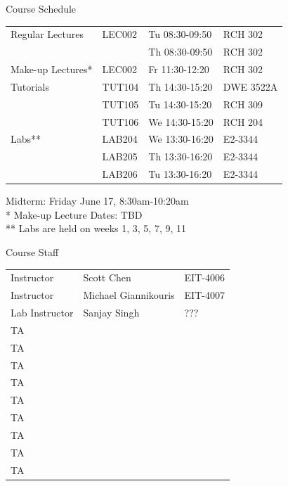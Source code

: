 \documentclass{beamer}
\begin{document}
	\begin{frame}{Course Schedule}
		\begin{center}
			\begin{tabular}{l l l l}
				Regular Lectures & LEC002 & Tu 08:30-09:50 & RCH 302 	\\
								 & 		  & Th 08:30-09:50 & RCH 302 	\\
				\hline
				Make-up Lectures*& LEC002 & Fr 11:30-12:20 & RCH 302 	\\
				\hline			
				Tutorials 		 & TUT104 & Th 14:30-15:20 & DWE 3522A 	\\
						  		 & TUT105 & Tu 14:30-15:20 & RCH 309   	\\
						  		 & TUT106 & We 14:30-15:20 & RCH 204   	\\
				\hline			
				Labs** 	  		 & LAB204 & We 13:30-16:20 & E2-3344	\\
								 & LAB205 & Th 13:30-16:20 & E2-3344	\\
								 & LAB206 & Tu 13:30-16:20 & E2-3344	\\
				\hline
			\end{tabular}
		\end{center}		
		Midterm: Friday June 17, 8:30am-10:20am			\\
		*    Make-up Lecture Dates: TBD					\\
		**   Labs are held on weeks 1, 3, 5, 7, 9, 11 	\\
	\end{frame}
	
	\begin{frame}{Course Staff}
		\begin{center}
			\begin{tabular}{l l l}
				Instructor & Scott Chen 			& EIT-4006 \\
				Instructor & Michael Giannikouris 	& EIT-4007 \\
				\hline
				Lab Instructor & Sanjay Singh & ??? \\
				\hline			
				TA \\
				TA \\
				TA \\
				TA \\
				TA \\
				TA \\
				TA \\
				TA \\
				TA \\
				\hline
			\end{tabular}
		\end{center}
	\end{frame}
	
\end{document}

